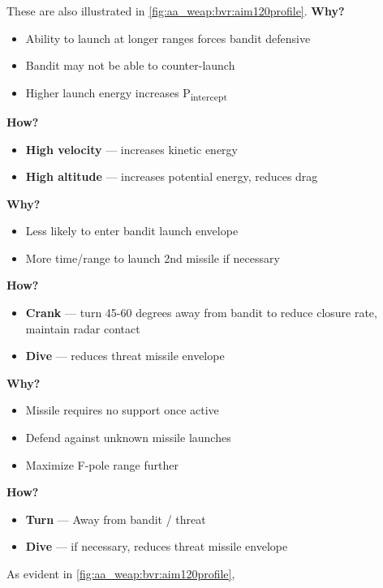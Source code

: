 \begin{tcoloritemize}
    These are also illustrated in \cref{fig:aa_weap:bvr:aim120profile}.
    \textbf{Why?}
    \begin{itemize}
        \item Ability to launch at longer ranges forces bandit defensive
        \item Bandit may not be able to counter-launch
        \item Higher launch energy increases P\textsubscript{intercept} %
    \end{itemize}
    \textbf{How?}
    \begin{itemize}
        \item \textbf{High velocity} --- increases kinetic energy 
        \item \textbf{High altitude} --- increases potential energy, reduces drag
    \end{itemize}
    \textbf{Why?}
    \begin{itemize}
        \item Less likely to enter bandit launch envelope
        \item More time/range to launch 2nd missile if necessary
    \end{itemize}
    \textbf{How?}
    \begin{itemize}
        \item \textbf{Crank} --- turn 45-60 degrees away from bandit to reduce closure rate, maintain radar contact
        \item \textbf{Dive} --- reduces threat missile envelope
    \end{itemize}
    \textbf{Why?}
    \begin{itemize}
        \item Missile requires no support once active
        \item Defend against unknown missile launches
        \item Maximize F-pole range further
    \end{itemize}
    \textbf{How?}
    \begin{itemize}
        \item \textbf{Turn} --- Away from bandit / threat
        \item \textbf{Dive} --- if necessary, reduces threat missile envelope 
    \end{itemize}
    As evident in \cref{fig:aa_weap:bvr:aim120profile}, 

\end{tcoloritemize}
